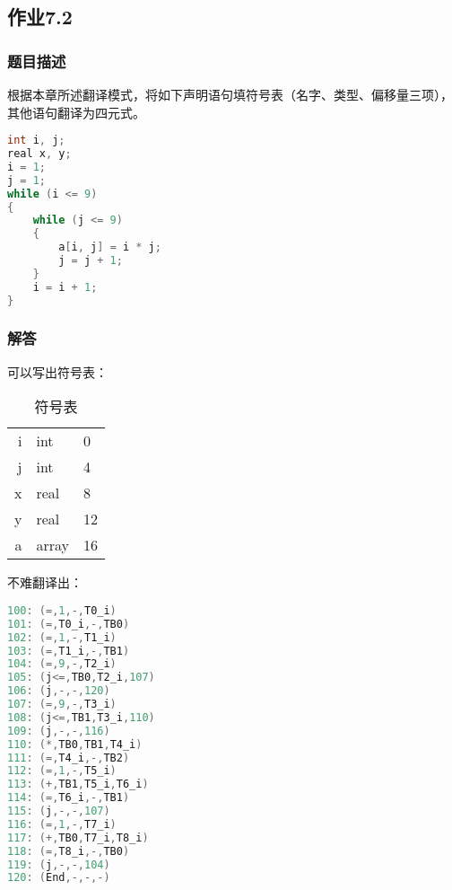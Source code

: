 \subsection{作业7.2}
\subsubsection{题目描述}
根据本章所述翻译模式，将如下声明语句填符号表（名字、类型、偏移量三项），其他语句翻译为四元式。
\begin{lstlisting}[language=c,title={四元式翻译}]
int i, j;
real x, y;
i = 1;
j = 1;
while (i <= 9)
{
	while (j <= 9)
	{
		a[i, j] = i * j;
		j = j + 1;
	}
	i = i + 1;
}
\end{lstlisting}

\subsubsection{解答}

可以写出符号表：


\begin{table}[H]
    \centering
    \begin{tabular}{rll}
    \hline
i  &  int   &  0 \\
j  &  int   &  4 \\
x  &  real  &  8 \\
y  &  real  &  12 \\
a  &  array &  16 \\
\hline
    \end{tabular}
    \caption{符号表}
    \label{tab:symbol}
\end{table}

不难翻译出：

\begin{lstlisting}[language=c,title={四元式翻译}]
100: (=,1,-,T0_i)
101: (=,T0_i,-,TB0)
102: (=,1,-,T1_i)
103: (=,T1_i,-,TB1)
104: (=,9,-,T2_i)
105: (j<=,TB0,T2_i,107)
106: (j,-,-,120)
107: (=,9,-,T3_i)
108: (j<=,TB1,T3_i,110)
109: (j,-,-,116)
110: (*,TB0,TB1,T4_i)
111: (=,T4_i,-,TB2)
112: (=,1,-,T5_i)
113: (+,TB1,T5_i,T6_i)
114: (=,T6_i,-,TB1)
115: (j,-,-,107)
116: (=,1,-,T7_i)
117: (+,TB0,T7_i,T8_i)
118: (=,T8_i,-,TB0)
119: (j,-,-,104)
120: (End,-,-,-)
\end{lstlisting}